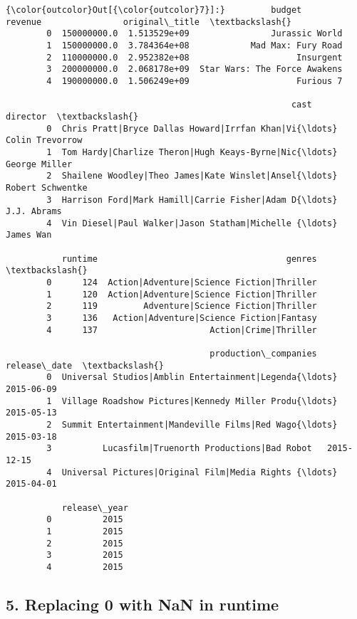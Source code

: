 \documentclass[11pt]{article}
\begin{document}
\begin{Verbatim}[commandchars=\\\{\}]
{\color{outcolor}Out[{\color{outcolor}7}]:}         budget       revenue                original\_title  \textbackslash{}
        0  150000000.0  1.513529e+09                Jurassic World   
        1  150000000.0  3.784364e+08            Mad Max: Fury Road   
        2  110000000.0  2.952382e+08                     Insurgent   
        3  200000000.0  2.068178e+09  Star Wars: The Force Awakens   
        4  190000000.0  1.506249e+09                     Furious 7   
        
                                                        cast          director  \textbackslash{}
        0  Chris Pratt|Bryce Dallas Howard|Irrfan Khan|Vi{\ldots}   Colin Trevorrow   
        1  Tom Hardy|Charlize Theron|Hugh Keays-Byrne|Nic{\ldots}     George Miller   
        2  Shailene Woodley|Theo James|Kate Winslet|Ansel{\ldots}  Robert Schwentke   
        3  Harrison Ford|Mark Hamill|Carrie Fisher|Adam D{\ldots}       J.J. Abrams   
        4  Vin Diesel|Paul Walker|Jason Statham|Michelle {\ldots}         James Wan   
        
           runtime                                     genres  \textbackslash{}
        0      124  Action|Adventure|Science Fiction|Thriller   
        1      120  Action|Adventure|Science Fiction|Thriller   
        2      119         Adventure|Science Fiction|Thriller   
        3      136   Action|Adventure|Science Fiction|Fantasy   
        4      137                      Action|Crime|Thriller   
        
                                        production\_companies release\_date  \textbackslash{}
        0  Universal Studios|Amblin Entertainment|Legenda{\ldots}   2015-06-09   
        1  Village Roadshow Pictures|Kennedy Miller Produ{\ldots}   2015-05-13   
        2  Summit Entertainment|Mandeville Films|Red Wago{\ldots}   2015-03-18   
        3          Lucasfilm|Truenorth Productions|Bad Robot   2015-12-15   
        4  Universal Pictures|Original Film|Media Rights {\ldots}   2015-04-01   
        
           release\_year  
        0          2015  
        1          2015  
        2          2015  
        3          2015  
        4          2015  
\end{Verbatim}
            
    \subsection{5. Replacing 0 with NaN in
runtime}\label{replacing-0-with-nan-in-runtime}
\end{document}
